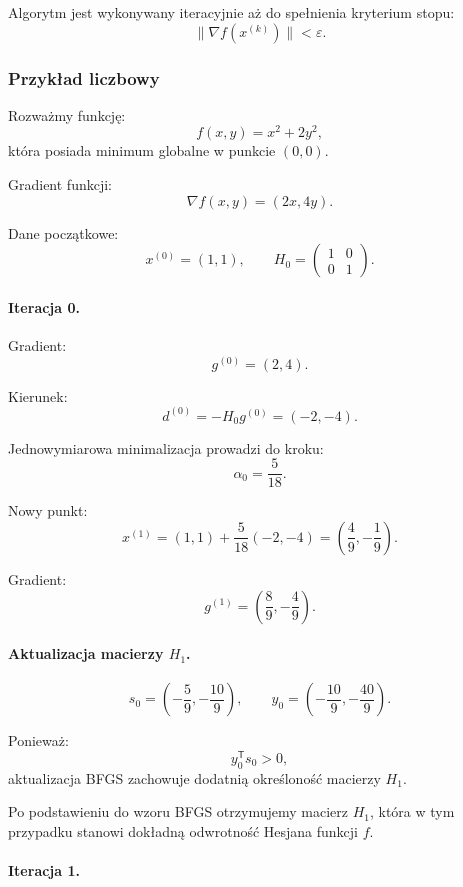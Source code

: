 \documentclass[10pt,a4paper]{article}
\begin{document}
Algorytm jest wykonywany iteracyjnie aż do spełnienia kryterium stopu:
\[
\|\nabla f(x^{(k)})\| < \varepsilon.
\]



\subsubsection{Przykład liczbowy}

Rozważmy funkcję:
\[
f(x,y) = x^2 + 2y^2,
\]
która posiada minimum globalne w punkcie $(0,0)$.

Gradient funkcji:
\[
\nabla f(x,y) = (2x, 4y).
\]

Dane początkowe:
\[
x^{(0)} = (1,1), \qquad
H_0 =
\begin{pmatrix}
1 & 0\\
0 & 1
\end{pmatrix}.
\]



\paragraph{Iteracja 0.}

Gradient:
\[
g^{(0)} = (2,4).
\]

Kierunek:
\[
d^{(0)} = -H_0 g^{(0)} = (-2,-4).
\]

Jednowymiarowa minimalizacja prowadzi do kroku:
\[
\alpha_0 = \frac{5}{18}.
\]

Nowy punkt:
\[
x^{(1)} =
(1,1) + \frac{5}{18}(-2,-4)
=
\left(\frac{4}{9}, -\frac{1}{9}\right).
\]

Gradient:
\[
g^{(1)} =
\left(\frac{8}{9}, -\frac{4}{9}\right).
\]



\paragraph{Aktualizacja macierzy $H_1$.}

\[
s_0 =
\left(-\frac{5}{9}, -\frac{10}{9}\right), \qquad
y_0 =
\left(-\frac{10}{9}, -\frac{40}{9}\right).
\]

Ponieważ:
\[
y_0^{\mathsf T} s_0 > 0,
\]
aktualizacja BFGS zachowuje dodatnią określoność macierzy $H_1$.

Po podstawieniu do wzoru BFGS otrzymujemy macierz $H_1$, która w tym
przypadku stanowi dokładną odwrotność Hesjana funkcji $f$.



\paragraph{Iteracja 1.}
\end{document}
